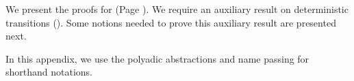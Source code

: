 

We present the proofs for 
 (Page \pageref{the:coincidence}).
We require an auxiliary result on 
deterministic transitions ().
Some notions needed to prove this auxiliary result are presented next.


%			
%
In this appendix, we use the polyadic abstractions and name passing 
for shorthand notations. 

